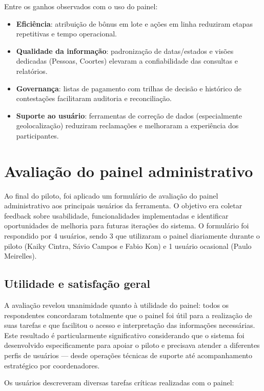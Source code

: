 Entre os ganhos observados com o uso do painel:
\begin{itemize}
  \item \textbf{Eficiência}: atribuição de bônus em lote e ações em linha
        reduziram etapas repetitivas e tempo operacional.
  \item \textbf{Qualidade da informação}: padronização de datas/estados e
        visões dedicadas (Pessoas, Coortes) elevaram a confiabilidade das
        consultas e relatórios.
  \item \textbf{Governança}: listas de pagamento com trilhas de decisão e
        histórico de contestações facilitaram auditoria e reconciliação.
  \item \textbf{Suporte ao usuário}: ferramentas de correção de dados
        (especialmente geolocalização) reduziram reclamações e melhoraram a
        experiência dos participantes.
\end{itemize}


\section{Avaliação do painel administrativo}
\label{sec:avaliacao-painel}

Ao final do piloto, foi aplicado um formulário de avaliação do painel administrativo aos principais usuários da ferramenta. O objetivo era coletar feedback sobre usabilidade, funcionalidades implementadas e identificar oportunidades de melhoria para futuras iterações do sistema. O formulário foi respondido por 4 usuários, sendo 3 que utilizaram o painel diariamente durante o piloto (Kaiky Cintra, Sávio Campos e Fabio Kon) e 1 usuário ocasional (Paulo Meirelles).

\subsection{Utilidade e satisfação geral}

A avaliação revelou unanimidade quanto à utilidade do painel: todos os respondentes concordaram totalmente que o painel foi útil para a realização de suas tarefas e que facilitou o acesso e interpretação das informações necessárias. Este resultado é particularmente significativo considerando que o sistema foi desenvolvido especificamente para apoiar o piloto e precisava atender a diferentes perfis de usuários --- desde operações técnicas de suporte até acompanhamento estratégico por coordenadores.

Os usuários descreveram diversas tarefas críticas realizadas com o painel:

